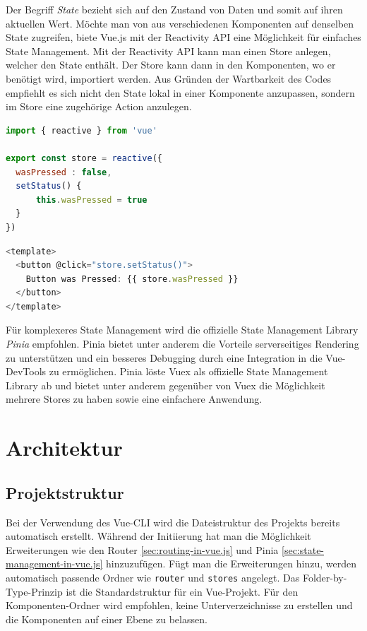 Der Begriff \emph{State} bezieht sich auf den Zustand von Daten und somit auf ihren aktuellen Wert.
Möchte man von aus verschiedenen Komponenten auf denselben State zugreifen,
biete Vue.js mit der Reactivity API eine Möglichkeit für einfaches State Management.
Mit der Reactivity API kann man einen Store anlegen, welcher den State enthält.
Der Store kann dann in den Komponenten, wo er benötigt wird, importiert werden.
Aus Gründen der Wartbarkeit des Codes empfiehlt es sich nicht den State lokal in einer Komponente anzupassen,
sondern im Store eine zugehörige Action anzulegen. \cite{vueStateManagement}

\begin{lstlisting}[caption={Anlegen eines Stores mit Reactivity API},language=javascript,label={lst:Anlegen-Store}]
import { reactive } from 'vue'

export const store = reactive({
  wasPressed : false,
  setStatus() {
      this.wasPressed = true
  }
})
\end{lstlisting}

\begin{lstlisting}[caption={Vewendung des Stores},language=javascript,label={lst:Verwendung-Store}]
<template>
  <button @click="store.setStatus()">
    Button was Pressed: {{ store.wasPressed }}
  </button>
</template>
\end{lstlisting}

Für komplexeres State Management wird die offizielle State Management Library \emph{Pinia} empfohlen.
Pinia bietet unter anderem die Vorteile serverseitiges Rendering zu unterstützen und
ein besseres Debugging durch eine Integration in die Vue-DevTools zu ermöglichen.
Pinia löste Vuex als offizielle State Management Library ab und bietet unter anderem gegenüber von Vuex
die Möglichkeit mehrere Stores zu haben sowie eine einfachere Anwendung.  \cite{vueStateManagement}


\section{Architektur}

\subsection*{Projektstruktur}
Bei der Verwendung des Vue-CLI wird die Dateistruktur des Projekts bereits automatisch erstellt.
Während der Initiierung hat man die Möglichkeit Erweiterungen wie den Router \ref{sec:routing-in-vue.js} und Pinia \ref{sec:state-management-in-vue.js} hinzuzufügen.
Fügt man die Erweiterungen hinzu, werden automatisch passende Ordner wie \texttt{router} und \texttt{stores} angelegt.
Das Folder-by-Type-Prinzip ist die Standardstruktur für ein Vue-Projekt.
Für den Komponenten-Ordner wird empfohlen, keine Unterverzeichnisse zu erstellen und
die Komponenten auf einer Ebene zu belassen. \cite{largeScaleVue}

